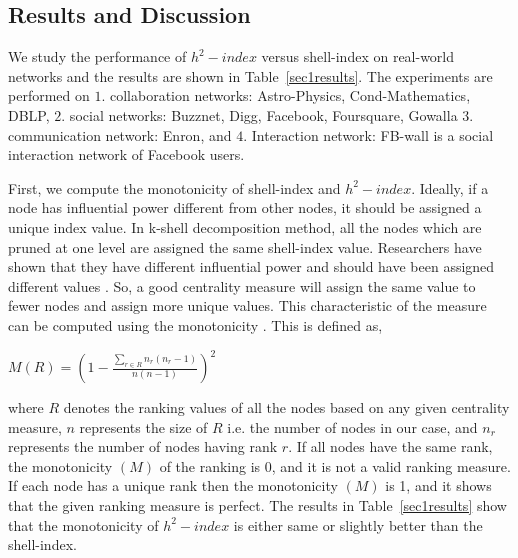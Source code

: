 \documentclass[conference]{IEEEtran}
\begin{document}

\subsection{Results and Discussion}

We study the performance of $h^2-index$ versus shell-index on real-world networks and the results are shown in Table~\ref{sec1results}. The experiments are performed on $1.$ collaboration networks: Astro-Physics, Cond-Mathematics, DBLP, $2.$ social networks: Buzznet, Digg, Facebook, Foursquare, Gowalla $3.$ communication network: Enron, and $4.$ Interaction network: FB-wall is a social interaction network of Facebook users.

First, we compute the monotonicity of shell-index and $h^2-index$. Ideally, if a node has influential power different from other nodes, it should be assigned a unique index value. In k-shell decomposition method, all the nodes which are pruned at one level are assigned the same shell-index value. Researchers have shown that they have different influential power and should have been assigned different values \cite{zareie2018hierarchical, wang2016fast, zeng2013ranking}. So, a good centrality measure will assign the same value to fewer nodes and assign more unique values. This characteristic of the measure can be computed using the monotonicity \cite{bae2014identifying}. This is defined as,

\begin{center}
$M(R)=\left( 1-\frac{\sum_{r \in R}n_r(n_r-1)}{n(n-1)} \right) ^2$
\end{center}

where $R$ denotes the ranking values of all the nodes based on any given centrality measure, $n$ represents the size of $R$ i.e. the number of nodes in our case, and $n_r$ represents the number of nodes having rank $r$. If all nodes have the same rank, the monotonicity $(M)$ of the ranking is 0, and it is not a valid ranking measure. If each node has a unique rank then the monotonicity $(M)$ is 1, and it shows that the given ranking measure is perfect. The results in Table~\ref{sec1results} show that the monotonicity of $h^2-index$ is either same or slightly better than the shell-index. 
\end{document}

